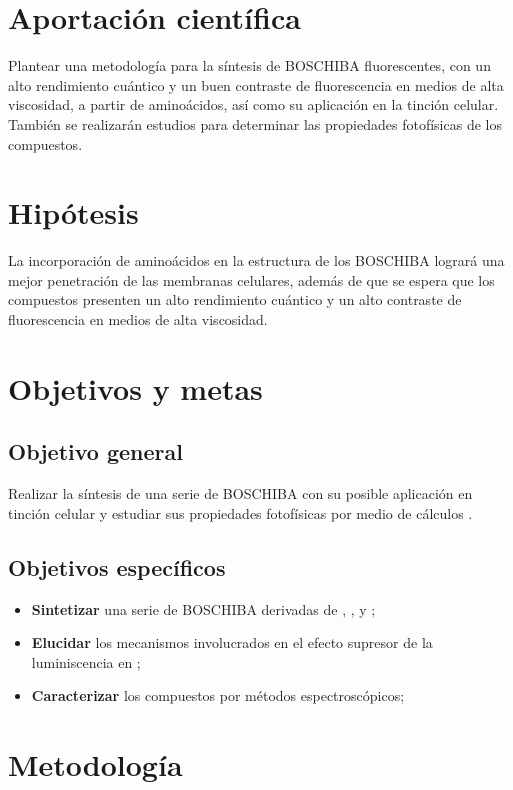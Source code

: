 \documentclass[12pt,spanish]{scrartcl}
\begin{document}
\section{Aportación científica}
Plantear una metodología para la síntesis de \gls{BOSCHIBA} fluorescentes, con un alto rendimiento cuántico y un buen contraste de fluorescencia en medios de alta viscosidad, a partir de aminoácidos, así como su aplicación en la tinción celular. También se realizarán estudios \insilico{} para determinar las propiedades fotofísicas de los compuestos. 

\section{Hipótesis}
La incorporación de aminoácidos en la estructura de los \gls{BOSCHIBA} logrará una mejor penetración de las membranas celulares, además de que se espera que los compuestos presenten un alto rendimiento cuántico y un alto contraste de fluorescencia en medios de alta viscosidad.

\section{Objetivos y metas}
\subsection{Objetivo general}
Realizar la síntesis de una serie de \gls{BOSCHIBA} con su posible aplicación en tinción celular y estudiar sus propiedades fotofísicas por medio de cálculos \insilico{}.

\subsection{Objetivos específicos}
\begin{itemize}
    \item \textbf{Sintetizar} una serie de \gls{BOSCHIBA} derivadas de , ,  y ;
    \item \textbf{Elucidar} los mecanismos involucrados en el efecto supresor de la luminiscencia en ;
    \item \textbf{Caracterizar} los compuestos por métodos espectroscópicos;
\end{itemize}

\section{Metodología}
\end{document}

